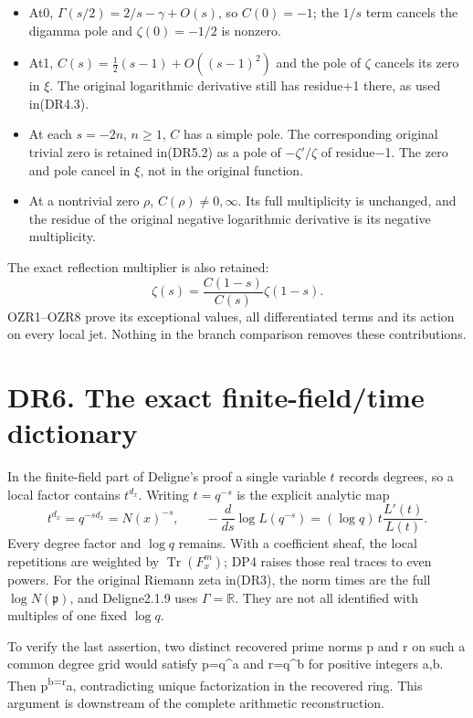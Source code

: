 \documentclass[
]{report}
\providecommand{\tightlist}{%
  \setlength{\itemsep}{0pt}\setlength{\parskip}{0pt}}
\begin{document}
\begin{itemize}
\tightlist
\item
  At0, \(\Gamma(s/2)=2/s-\gamma+O(s)\), so \(C(0)=-1\); the \(1/s\) term
  cancels the digamma pole and \(\zeta(0)=-1/2\) is nonzero.
\item
  At1, \(C(s)=\tfrac12(s-1)+O((s-1)^2)\) and the pole of \(\zeta\)
  cancels its zero in \(\xi\). The original logarithmic derivative still
  has residue+1 there, as used in(DR4.3).
\item
  At each \(s=-2n\), \(n\ge1\), \(C\) has a simple pole. The
  corresponding original trivial zero is retained in(DR5.2) as a pole of
  \(-\zeta'/\zeta\) of residue−1. The zero and pole cancel in \(\xi\),
  not in the original function.
\item
  At a nontrivial zero \(\rho\), \(C(\rho)\ne0,\infty\). Its full
  multiplicity is unchanged, and the residue of the original negative
  logarithmic derivative is its negative multiplicity.
\end{itemize}

The exact reflection multiplier is also retained: \[
\zeta(s)=\frac{C(1-s)}{C(s)}\zeta(1-s).
\tag{DR5.3}
\] OZR1--OZR8 prove its exceptional values, all differentiated terms and
its action on every local jet. Nothing in the branch comparison removes
these contributions.

\section{DR6. The exact finite-field/time
dictionary}\label{dr6.-the-exact-finite-fieldtime-dictionary}

In the finite-field part of Deligne's proof a single variable \(t\)
records degrees, so a local factor contains \(t^{d_x}\). Writing
\(t=q^{-s}\) is the explicit analytic map \[
t^{d_x}=q^{-sd_x}=N(x)^{-s},\qquad
-\frac{d}{ds}\log L(q^{-s})
=(\log q)\,t\frac{L'(t)}{L(t)}.
\tag{DR6.1}
\] Every degree factor and \(\log q\) remains. With a coefficient sheaf,
the local repetitions are weighted by \(\operatorname{Tr}(F_x^m)\); DP4
raises those real traces to even powers. For the original Riemann zeta
in(DR3), the norm times are the full \(\log N(\mathfrak p)\), and
Deligne2.1.9 uses \(\Gamma=\mathbb R\). They are not all identified with
multiples of one fixed \(\log q\).

To verify the last assertion, two distinct recovered prime norms p and r
on such a common degree grid would satisfy p=q\^{}a and r=q\^{}b for
positive integers a,b. Then p\textsuperscript{b=r}a, contradicting
unique factorization in the recovered ring. This argument is downstream
of the complete arithmetic reconstruction.
\end{document}
